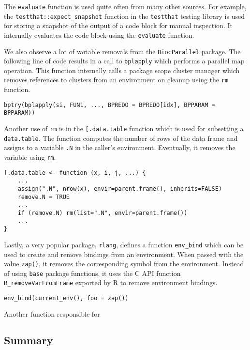 \documentclass[review,nonacm,screen,acmsmall,anonymous=true]{acmart}
\newcommand{\code}[1]{\lstinline |#1|\xspace}
\begin{document}
The \code{evaluate} function is used quite often from many other sources. For
example, the \code{testthat::expect_snapshot} function in the \code{testthat}
testing library is used for storing a snapshot of the output of a code block for
manual inspection. It internally evaluates the code block using the
\code{evaluate} function.


We also observe a lot of variable removals from the \code{BiocParallel} package.
The following line of code results in a call to \code{bplapply} which performs a
parallel map operation. This function internally calls a package scope cluster
manager which removes references to clusters from an environment on cleanup
using the \code{rm} function.

\begin{lstlisting}
bptry(bplapply(si, FUN1, ..., BPREDO = BPREDO[idx], BPPARAM = BPPARAM))
\end{lstlisting}

Another use of \code{rm} is in the \code{[.data.table} function which is used
for subsetting a \code{data.table}. The function computes the number of rows of
the data frame and assigns to a variable \code{.N} in the caller's environment.
Eventually, it removes the variable using \code{rm}.

\begin{lstlisting}
[.data.table <- function (x, i, j, ...) {
    ...
    assign(".N", nrow(x), envir=parent.frame(), inherits=FALSE)
    remove.N = TRUE
    ...
    if (remove.N) rm(list=".N", envir=parent.frame())
    ...
}
\end{lstlisting}

Lastly, a very popular package, \code{rlang}, defines a function \code{env_bind}
which can be used to create and remove bindings from an environment. When passed
with the value \code{zap()}, it removes the corresponding symbol from the
environment. Instead of using \code{base} package functions, it uses the C API
function \code{R_removeVarFromFrame} exported by R to remove environment
bindings.

\begin{lstlisting}
env_bind(current_env(), foo = zap())
\end{lstlisting}

Another function responsible for 

\subsection{Summary}
\end{document}

